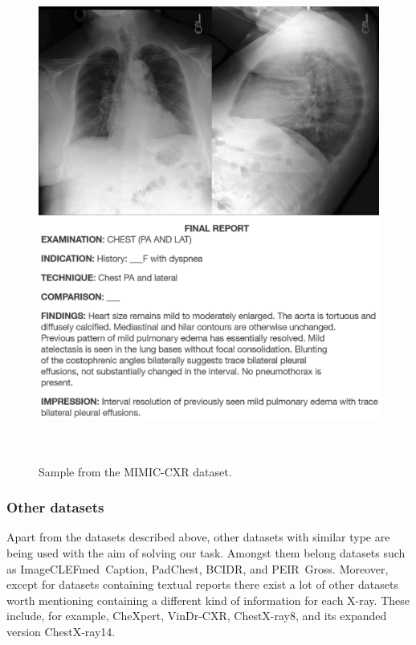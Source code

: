 \begin{figure}[h]\centering
\includegraphics[width=135mm, height=163mm]{../img/mimic_s57861150}
\caption{Sample from the MIMIC-CXR dataset.}
\label{fig04:MimicCXRSample}
\end{figure}

\subsubsection{Other datasets}
Apart from the datasets described above, other datasets with similar type are being used with the aim of solving our task. Amongst them belong datasets such as ImageCLEFmed~Caption\citep{ImageCLEFmedicalCaptionOverview2022}, PadChest\citep{bustos2020padchest}, BCIDR\citep{zhang2017mdnet}, and PEIR~Gross\citep{jing2017automatic}. Moreover, except for datasets containing textual reports there exist a lot of other datasets worth mentioning containing a different kind of information for each X-ray. These include, for example, CheXpert\citep{irvin2019chexpert}, VinDr-CXR\citep{nguyen2020vindr}, ChestX-ray8\citep{wang2017chestx}, and its expanded version ChestX-ray14.

